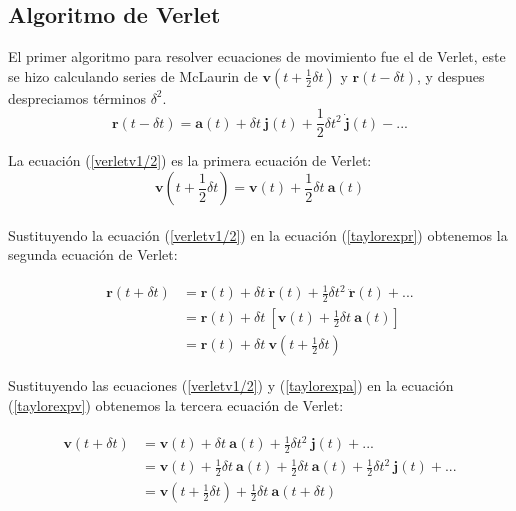 \subsection{Algoritmo de Verlet}

El primer algoritmo para resolver ecuaciones de movimiento fue el de Verlet, este se hizo calculando series de McLaurin de $\mathbf{v}(t+\frac{1}{2}\delta t)$ y $\mathbf{r}(t-\delta t)$, y despues despreciamos términos $\delta^2$.\\

\begin{equation}\label{taylorexpr-}
    \mathbf{r}(t - \delta t) = \mathbf{a}(t)+\delta t\ \mathbf{j}(t) + \frac{1}{2}\delta t^2\ \mathbf{\dot{j}}(t)-...
\end{equation}

La ecuación (\ref{verletv1/2}) es la primera ecuación de Verlet:\\
\begin{equation}\label{verletv1/2}
    \mathbf{v}(t + \frac{1}{2}\delta t) = \mathbf{v}(t)+\frac{1}{2}\delta t\ \mathbf{a}(t)
\end{equation}\\

Sustituyendo la ecuación (\ref{verletv1/2}) en la ecuación (\ref{taylorexpr}) obtenemos la segunda ecuación de Verlet:

\begin{align} \label{verletr}
\begin{split}
    \mathbf{r}(t + \delta t) &= \mathbf{r}(t)+\delta t\ \dot{\mathbf{r}}(t) + \frac{1}{2}\delta t^2\ \ddot{\mathbf{r}}(t)+...\\
                             &= \mathbf{r}(t)+\delta t\ \left[\mathbf{v}(t) + \frac{1}{2}\delta t\ \mathbf{a}(t)\right]\\
                             &= \mathbf{r}(t)+\delta t\ \mathbf{v}(t+\frac{1}{2}\delta t)
\end{split}
\end{align}

Sustituyendo las ecuaciones (\ref{verletv1/2}) y (\ref{taylorexpa}) en la ecuación (\ref{taylorexpv}) obtenemos la tercera ecuación de Verlet:

\begin{align} \label{verletv}
\begin{split}
    \mathbf{v}(t + \delta t) &= \mathbf{v}(t)+\delta t\ \mathbf{a}(t) + \frac{1}{2}\delta t^2\ \mathbf{j}(t)+...\\
                             &= \mathbf{v}(t)+\frac{1}{2}\delta t\ \mathbf{a}(t) + \frac{1}{2}\delta t\ \mathbf{a}(t)+ \frac{1}{2}\delta t^2\ \mathbf{j}(t)+...\\
                             &= \mathbf{v}(t + \frac{1}{2}\delta t) + \frac{1}{2}\delta t\ \mathbf{a}(t + \delta t)
\end{split}
\end{align}

